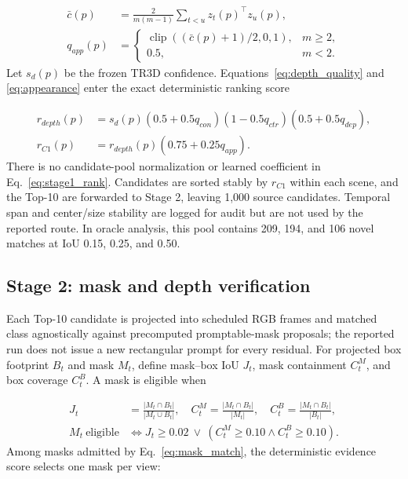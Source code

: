 \documentclass[11pt,a4paper]{article}
\begin{document}
\begin{equation}
\begin{aligned}
\bar c(p)&=\frac{2}{m(m-1)}\sum_{t<u}z_t(p)^\top z_u(p),\\
q_{app}(p)&=\begin{cases}
\operatorname{clip}\!\left((\bar c(p)+1)/2,0,1\right),&m\ge2,\\
0.5,&m<2.
\end{cases}
\end{aligned}
\label{eq:appearance}
\end{equation}
Let \(s_d(p)\) be the frozen TR3D confidence. Equations~\eqref{eq:depth_quality} and \eqref{eq:appearance} enter the exact deterministic ranking score

\begin{equation}
\begin{aligned}
r_{depth}(p)&=s_d(p)(0.5+0.5q_{con})(1-0.5q_{ctr})(0.5+0.5q_{dep}),\\
r_{C1}(p)&=r_{depth}(p)(0.75+0.25q_{app}).
\end{aligned}
\label{eq:stage1_rank}
\end{equation}
There is no candidate-pool normalization or learned coefficient in Eq.~\eqref{eq:stage1_rank}. Candidates are sorted stably by \(r_{C1}\) within each scene, and the Top-10 are forwarded to Stage 2, leaving 1,000 source candidates. Temporal span and center/size stability are logged for audit but are not used by the reported route. In oracle analysis, this pool contains 209, 194, and 106 novel matches at IoU 0.15, 0.25, and 0.50.

\subsection{Stage 2: mask and depth verification}
Each Top-10 candidate is projected into scheduled RGB frames and matched class agnostically against precomputed promptable-mask proposals; the reported run does not issue a new rectangular prompt for every residual. For projected box footprint \(B_t\) and mask \(M_t\), define mask--box IoU \(J_t\), mask containment \(C_t^M\), and box coverage \(C_t^B\). A mask is eligible when

\begin{equation}
\begin{aligned}
J_t&=\frac{|M_t\cap B_t|}{|M_t\cup B_t|},\quad
C_t^M=\frac{|M_t\cap B_t|}{|M_t|},\quad
C_t^B=\frac{|M_t\cap B_t|}{|B_t|},\\
M_t\ \text{eligible}&\Longleftrightarrow
J_t\ge0.02\ \lor\ (C_t^M\ge0.10\land C_t^B\ge0.10).
\end{aligned}
\label{eq:mask_match}
\end{equation}
Among masks admitted by Eq.~\eqref{eq:mask_match}, the deterministic evidence score selects one mask per view:
\end{document}
